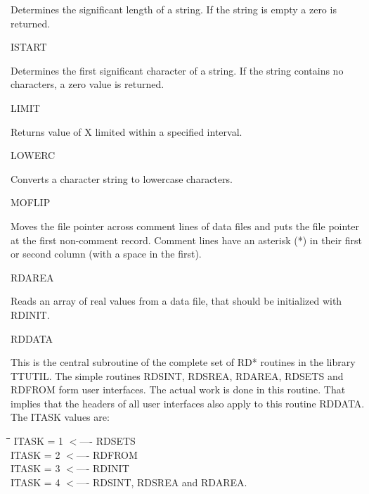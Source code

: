 \documentclass[11pt]{article}
\begin{document}
\begin{indenting}{2.54cm}
Determines the significant length of a string. If the string is empty a zero is
returned.
\end{indenting}
ISTART
\testlastline

\begin{indenting}{2.54cm}
Determines the first significant character of a string. If the string cont\-ains
no characters, a zero value is returned.
\end{indenting}
LIMIT
\testlastline

\begin{indenting}{2.54cm}
Returns value of X limited within a specified interval.
\end{indenting}
LOWERC
\testlastline

\begin{indenting}{2.54cm}
Converts a character string to lowercase characters.
\end{indenting}
MOFLIP
\testlastline

\begin{indenting}{2.54cm}
Moves the file pointer across comment lines of data files and puts the file
pointer at the first non-comment record. Comment lines have an asterisk
(*) in their first or second column (with a space in the first).\hfill  
\end{indenting}
RDAREA
\testlastline

\begin{indenting}{2.54cm}
Reads an array of real values from a data file, that should be initialized
with RDINIT.
\end{indenting}
RDDATA
\testlastline

\begin{indenting}{2.54cm}
This is the central subroutine of the complete set of RD* routines in the
library TTUTIL. The simple routines RDSINT, RDSREA, RDAR\-EA,
RDSETS and RDFROM form user interfaces. The actual work is done in
this routine. That implies that the headers of all user interfaces also apply
to this routine RDDATA. The ITASK values are:
\end{indenting}
\begin{tabbing}
\hspace{1.27cm}\=\hspace{1.27cm}\=\hspace{1.27cm}\=\hspace{1.27cm}\=%
\hspace{1.27cm}\=\hspace{1.27cm}\=\hspace{1.27cm}\=\hspace{1.27cm}\=%
\hspace{1.27cm}\=\hspace{1.27cm}\=\kill
\>\> ITASK = 1 $<$---- RDSETS\\
\>\> ITASK = 2 $<$---- RDFROM\\
\>\> ITASK = 3 $<$---- RDINIT\\
\>\> ITASK = 4 $<$---- RDSINT, RDSREA and RDAREA.
\end{tabbing}
\end{document}
